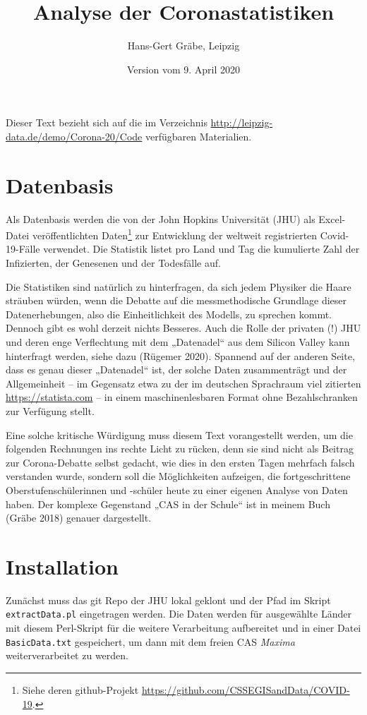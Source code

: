 \documentclass[a4paper,11pt]{article}
\title{Analyse der Coronastatistiken}
\author{Hans-Gert Gräbe, Leipzig}
\date{Version vom 9. April 2020}
\begin{document}
\maketitle

Dieser Text bezieht sich auf die im Verzeichnis
\url{http://leipzig-data.de/demo/Corona-20/Code} verfügbaren Materialien.

\section{Datenbasis}

Als Datenbasis werden die von der John Hopkins Universität (JHU) als
Excel-Datei veröffentlichten Daten\footnote{Siehe deren github-Projekt
  \url{https://github.com/CSSEGISandData/COVID-19}.} zur Entwicklung der
weltweit registrierten Covid-19-Fälle verwendet. Die Statistik listet pro Land
und Tag die kumulierte Zahl der Infizierten, der Genesenen und der Todesfälle
auf.

Die Statistiken sind natürlich zu hinterfragen, da sich jedem Physiker die
Haare sträuben würden, wenn die Debatte auf die messmethodische Grundlage
dieser Datenerhebungen, also die Einheitlichkeit des Modells, zu sprechen
kommt.  Dennoch gibt es wohl derzeit nichts Besseres. Auch die Rolle der
privaten (!)  JHU und deren enge Verflechtung mit dem „Datenadel“ aus dem
Silicon Valley kann hinterfragt werden, siehe dazu (Rügemer 2020).  Spannend
auf der anderen Seite, dass es genau dieser „Datenadel“ ist, der solche Daten
zusammenträgt und der Allgemeinheit -- im Gegensatz etwa zu der im deutschen
Sprachraum viel zitierten \url{https://statista.com} -- in einem
maschinenlesbaren Format ohne Bezahlschranken zur Verfügung stellt.

Eine solche kritische Würdigung muss diesem Text vorangestellt werden, um die
folgenden Rechnungen ins rechte Licht zu rücken, denn sie sind nicht als
Beitrag zur Corona-Debatte selbst gedacht, wie dies in den ersten Tagen
mehrfach falsch verstanden wurde, sondern soll die Möglichkeiten aufzeigen,
die fortgeschrittene Oberstufenschülerinnen und -schüler heute zu einer
eigenen Analyse von Daten haben.  Der komplexe Gegenstand „CAS in der Schule“
ist in meinem Buch (Gräbe 2018) genauer dargestellt. 

\section{Installation} 

Zunächst muss das git Repo der JHU lokal geklont und der Pfad im Skript
\texttt{extractData.pl} eingetragen werden.  Die Daten werden für ausgewählte
Länder mit diesem Perl-Skript für die weitere Verarbeitung aufbereitet und in
einer Datei \texttt{BasicData.txt} gespeichert, um dann mit dem freien CAS
\emph{Maxima} weiterverarbeitet zu werden.
\end{document}
